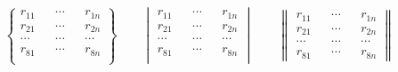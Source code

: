 \documentclass[withoutpreface,bwprint]{cumcmthesis} %
\begin{document}
\begin{appendices}
\begin{equation}
    \begin{Bmatrix} 
        r_{11}  &&  \cdots  &&  r_{1n}  \\
        r_{21}  &&  \cdots  &&  r_{2n}  \\ 
        \cdots  &&  \cdots  &&  \cdots  \\
        r_{81}  &&  \cdots  &&  r_{8n}  \\
    \end{Bmatrix} 
    \quad\quad
    \begin{vmatrix} 
        r_{11}  &&  \cdots  &&  r_{1n}  \\
        r_{21}  &&  \cdots  &&  r_{2n}  \\ 
        \cdots  &&  \cdots  &&  \cdots  \\
        r_{81}  &&  \cdots  &&  r_{8n}  \\
    \end{vmatrix} 
    \quad\quad
    \begin{Vmatrix} 
        r_{11}  &&  \cdots  &&  r_{1n}  \\
        r_{21}  &&  \cdots  &&  r_{2n}  \\ 
        \cdots  &&  \cdots  &&  \cdots  \\
        r_{81}  &&  \cdots  &&  r_{8n}  
    \end{Vmatrix}     
\end{equation}



\end{appendices}
\end{document}
